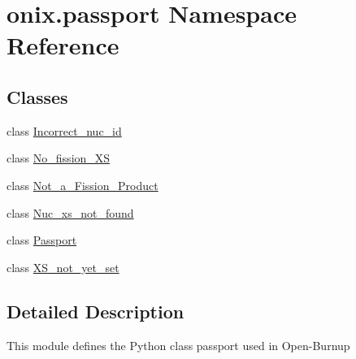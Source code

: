 \hypertarget{namespaceonix_1_1passport}{}\section{onix.\+passport Namespace Reference}
\label{namespaceonix_1_1passport}
\subsection*{Classes}
\begin{DoxyCompactItemize}
\item 
class \hyperlink{classonix_1_1passport_1_1Incorrect__nuc__id}{Incorrect\+\_\+nuc\+\_\+id}
\item 
class \hyperlink{classonix_1_1passport_1_1No__fission__XS}{No\+\_\+fission\+\_\+\+XS}
\item 
class \hyperlink{classonix_1_1passport_1_1Not__a__Fission__Product}{Not\+\_\+a\+\_\+\+Fission\+\_\+\+Product}
\item 
class \hyperlink{classonix_1_1passport_1_1Nuc__xs__not__found}{Nuc\+\_\+xs\+\_\+not\+\_\+found}
\item 
class \hyperlink{classonix_1_1passport_1_1Passport}{Passport}
\item 
class \hyperlink{classonix_1_1passport_1_1XS__not__yet__set}{X\+S\+\_\+not\+\_\+yet\+\_\+set}
\end{DoxyCompactItemize}


\subsection{Detailed Description}
\begin{DoxyVerb}This module defines the Python class passport used in Open-Burnup\end{DoxyVerb}
 